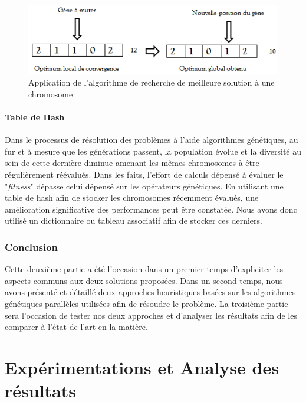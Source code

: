 \documentclass[12pt,a4paper]{article}
\begin{document}
	\begin{figure}[!h]
		\begin{center}
			\includegraphics[scale=.6]{img/local_search_fig.png}
			\caption{Application de l'algorithme de recherche de meilleure solution à une chromosome}
			\label{fig:local_search_fig}
		\end{center}
	\end{figure} 
	
	\subsection{Table de Hash}
	Dans le processus de résolution des problèmes à l'aide algorithmes génétiques, au fur et à mesure que les générations passent, la population évolue et la diversité au sein de cette dernière diminue amenant les mêmes chromosomes à être régulièrement réévalués. Dans les faits, l'effort de calculs dépensé à évaluer le "\emph{fitness}" dépasse celui dépensé sur les opérateurs génétiques. En utilisant une table de hash afin de stocker les chromosomes récemment évalués, une amélioration significative des performances peut être constatée. Nous avons donc utilisé un dictionnaire ou tableau associatif afin de stocker ces derniers.
	
	\section*{Conclusion}
	Cette deuxième partie a été l'occasion dans un premier temps d'expliciter les aspects communs aux deux solutions proposées. Dans un second temps, nous avons présenté et détaillé deux approches heuristiques basées sur les algorithmes génétiques parallèles utilisées afin de résoudre le problème. La troisième partie sera l'occasion de tester nos deux approches et d'analyser les résultats afin de les comparer à l'état de l'art en la matière.
	
	\newpage
	
	\part{Expérimentations et Analyse des résultats}
	\setcounter{section}{0}
\end{document}
